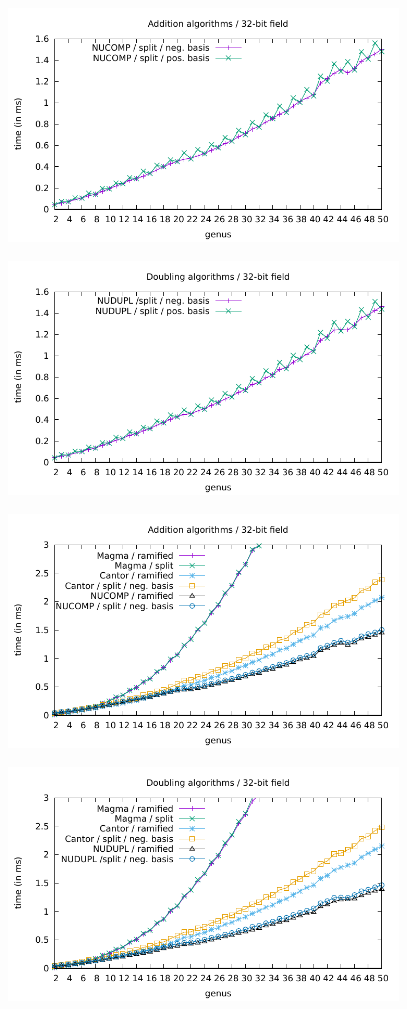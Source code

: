 \centerline{\includegraphics[width=0.775\textwidth]{balNucomp/add_pos_neg_split_32.pdf}}
\centerline{\includegraphics[width=0.775\textwidth]{balNucomp/dbl_pos_neg_split_32.pdf}}

\centerline{\includegraphics[width=0.775\textwidth]{balNucomp/add_y_32.pdf}}
\centerline{\includegraphics[width=0.775\textwidth]{balNucomp/dbl_y_32.pdf}}

